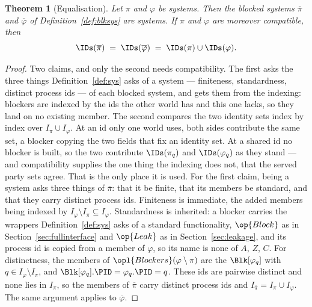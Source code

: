 \documentclass[10pt,oneside,openany]{book}
\theoremstyle{accentdef}
\theoremstyle{accentplain}
\newtheorem{theorem}[definition]{Theorem}
\begin{document}
\begin{theorem}[Equalisation]\label{thm:blk}
Let $\pi$ and $\varphi$ be systems. Then the blocked systems $\overline{\pi}$ and
$\overline{\varphi}$ of Definition~\ref{def:blksys} are systems. If
$\pi$ and $\varphi$ are moreover compatible, then
\[
  \IDs(\overline{\pi}) \;=\; \IDs(\overline{\varphi}) \;=\; \IDs(\pi) \cup \IDs(\varphi).
\]
\end{theorem}

\begin{proof}
Two claims, and only the second needs compatibility. The first asks the three things
Definition~\ref{def:sys} asks of a system --- finiteness, standardness, distinct process ids --- of
each blocked system, and gets them from the indexing: blockers are indexed by the ids the other
world has and this one lacks, so they land on no existing member. The second compares the two
identity sets index by index over $I_\pi \cup I_\varphi$. At an id only one world uses, both sides
contribute the same set, a blocker copying the two fields that fix an identity set. At a shared id
no blocker is built, so the two contribute $\IDs(\pi_q)$ and $\IDs(\varphi_q)$ as they stand --- and
compatibility supplies the one thing the indexing does not, that the served party sets agree. That
is the only place it is used.
For the first claim, being a system asks three things of $\overline{\pi}$: that it be finite, that
its members be standard, and that they carry distinct process ids. Finiteness is immediate, the
added members being indexed by $I_\varphi \setminus I_\pi \subseteq I_\varphi$. Standardness is
inherited: a blocker carries the wrappers Definition~\ref{def:sys} asks of a standard
functionality, $\op{Block}$ as in Section~\ref{sec:fullinterface} and $\op{Leak}$ as in
Section~\ref{sec:leakage}, and its process id is copied from a member of $\varphi$, so its name is
none of $A$, $Z$, $C$. For distinctness, the members of
$\opl{Blockers}(\varphi \setminus \pi)$ are the $\Blk[\varphi_q]$ with
$q \in I_\varphi \setminus I_\pi$, and $\Blk[\varphi_q].\PID = \varphi_q.\PID = q$. These ids are
pairwise distinct and none lies in $I_\pi$, so the members of $\overline{\pi}$ carry distinct
process ids and $I_{\overline{\pi}} = I_\pi \cup I_\varphi$. The same argument applies to
$\overline{\varphi}$.


\end{proof}
\end{document}
